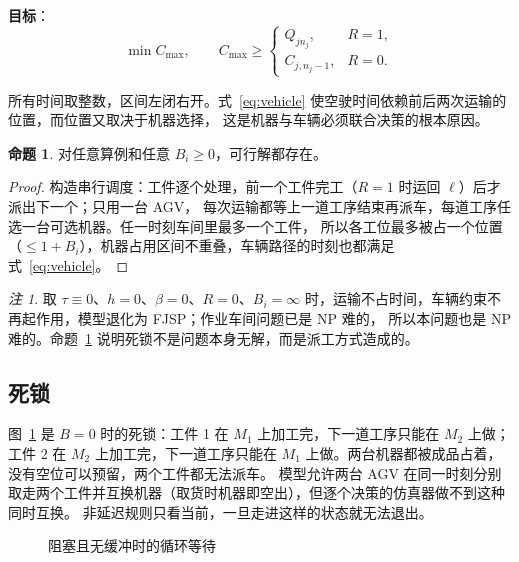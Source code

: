 \documentclass[11pt,a4paper]{ctexart}
\theoremstyle{definition}
\newtheorem{proposition}{命题}
\theoremstyle{remark}
\newtheorem{remark}{注}
\newcommand{\LU}{\ell}
\begin{document}
\noindent\textbf{目标}：
\begin{equation}
\min C_{\max},\qquad C_{\max}\ge \begin{cases} Q_{jn_j}, & R=1,\\ C_{j,n_j-1}, & R=0.\end{cases}
\end{equation}

所有时间取整数，区间左闭右开。式~\eqref{eq:vehicle} 使空驶时间依赖前后两次运输的位置，而位置又取决于机器选择，
这是机器与车辆必须联合决策的根本原因。

\begin{proposition}\label{prop:feasible}
对任意算例和任意 $B_i\ge 0$，可行解都存在。
\end{proposition}
\begin{proof}
构造串行调度：工件逐个处理，前一个工件完工（$R=1$ 时运回 $\LU$）后才派出下一个；只用一台 AGV，
每次运输都等上一道工序结束再派车，每道工序任选一台可选机器。任一时刻车间里最多一个工件，
所以各工位最多被占一个位置（$\le 1+B_i$），机器占用区间不重叠，车辆路径的时刻也都满足式~\eqref{eq:vehicle}。
\end{proof}

\begin{remark}
取 $\tau\equiv 0$、$h=0$、$\beta=0$、$R=0$、$B_i=\infty$ 时，运输不占时间，车辆约束不再起作用，模型退化为 FJSP；作业车间问题已是 NP 难的\cite{garey1976}，
所以本问题也是 NP 难的。命题~\ref{prop:feasible} 说明死锁不是问题本身无解，而是派工方式造成的。
\end{remark}

\subsection{死锁}

图~\ref{fig:deadlock} 是 $B=0$ 时的死锁：工件 1 在 $M_1$ 上加工完，下一道工序只能在 $M_2$ 上做；
工件 2 在 $M_2$ 上加工完，下一道工序只能在 $M_1$ 上做。两台机器都被成品占着，没有空位可以预留，两个工件都无法派车。
模型允许两台 AGV 在同一时刻分别取走两个工件并互换机器（取货时机器即空出），但逐个决策的仿真器做不到这种同时互换。
非延迟规则只看当前，一旦走进这样的状态就无法退出。

\begin{figure}[ht]
\centering
{}
\caption{阻塞且无缓冲时的循环等待}
\label{fig:deadlock}
\end{figure}
\end{document}
